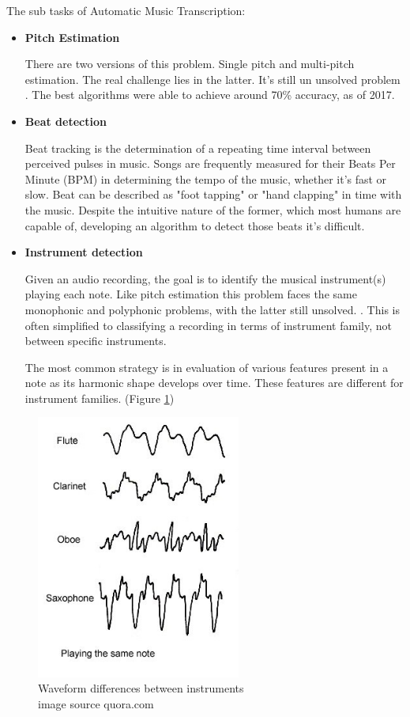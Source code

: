 \par
The sub tasks of Automatic Music Transcription:
\begin{itemize}
	\item \textbf{Pitch Estimation}
	\par
	There are two versions of this problem. Single pitch and multi-pitch estimation. The real challenge lies in the latter. It's still un unsolved problem \cite{glass_ceiling}.
	The best algorithms were able to achieve around 70\% accuracy, as of 2017. \cite{music_retrieval}
	\item \textbf{Beat detection}
	\par
	Beat tracking is the determination of a repeating time interval between perceived pulses in music. \cite{transcription}
	Songs are frequently measured for their Beats Per Minute (BPM) in determining the tempo of the music, whether it's fast or slow.
	Beat can be described as "foot tapping" or "hand clapping" in time with the music. Despite the intuitive nature of the former, which most humans are capable of, developing an algorithm to detect those beats it's difficult.
	\item \textbf{Instrument detection}
	\par
	Given an audio recording, the goal is to identify the musical instrument(s) playing each note. Like pitch estimation this problem faces the same monophonic and polyphonic problems, with the latter still unsolved. \cite{instrument_identification}. This is often simplified to classifying a recording in terms of instrument family, not between specific instruments.
	\par
	The most common strategy is in evaluation of various features present in a note as its harmonic shape develops over time. These features are different for instrument families. (Figure \ref{fig:instruments})
\end{itemize}

\begin{figure}[h]
	\caption[Waveform differences between instruments]{Waveform differences between instruments
		\\ image source quora.com}
	\centering
	\label{fig:instruments}
	\includegraphics[width=0.6\textwidth, height=0.4\textheight, keepaspectratio]{"resources/instruments"}
\end{figure}

